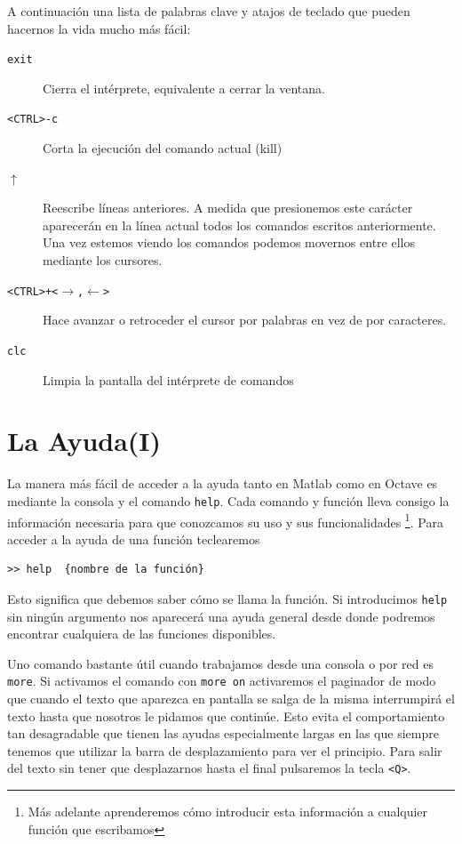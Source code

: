A continuación una lista de palabras clave y atajos de teclado que
pueden hacernos la vida mucho más fácil:

\begin{description}
\item [\texttt{exit}]Cierra el intérprete, equivalente a cerrar la
  ventana.
\item [\texttt{<CTRL>-c}]Corta la ejecución del comando actual (kill)
\item [$\uparrow$]Reescribe líneas anteriores. A medida que
  presionemos este carácter aparecerán en la línea actual todos los
  comandos escritos anteriormente. Una vez estemos viendo los comandos
  podemos movernos entre ellos mediante los cursores.
\item [\texttt{<CTRL>+<$\rightarrow$,$\leftarrow$>}]Hace avanzar o
  retroceder el cursor por palabras en vez de por caracteres.
\item [\texttt{clc}]Limpia la pantalla del intérprete de comandos
\end{description}

\section{La Ayuda(I)}

La manera más fácil de acceder a la ayuda tanto en Matlab como en
Octave es mediante la consola y el comando \texttt{help}.
Cada comando y función lleva consigo la información necesaria para que
conozcamos su uso y sus funcionalidades%
\footnote{Más adelante aprenderemos cómo introducir esta información a
  cualquier función que escribamos%
}. Para acceder a la ayuda de una función teclearemos

\begin{verbatim}
>> help  {nombre de la función}
\end{verbatim}

Esto significa que debemos saber cómo se llama la función. Si
introducimos \texttt{help} sin ningún argumento nos aparecerá una
ayuda general desde donde podremos encontrar cualquiera de las
funciones disponibles.

Uno comando bastante útil cuando trabajamos desde una consola o por
red es \texttt{more}. Si activamos el comando con
\texttt{more on} activaremos el paginador de modo que cuando el texto
que aparezca en pantalla se salga de la misma interrumpirá el texto
hasta que nosotros le pidamos que continúe. Esto evita el
comportamiento tan desagradable que tienen las ayudas especialmente
largas en las que siempre tenemos que utilizar la barra de
desplazamiento para ver el principio. Para salir del texto sin tener
que desplazarnos hasta el final pulsaremos la tecla \texttt{<Q>}.


